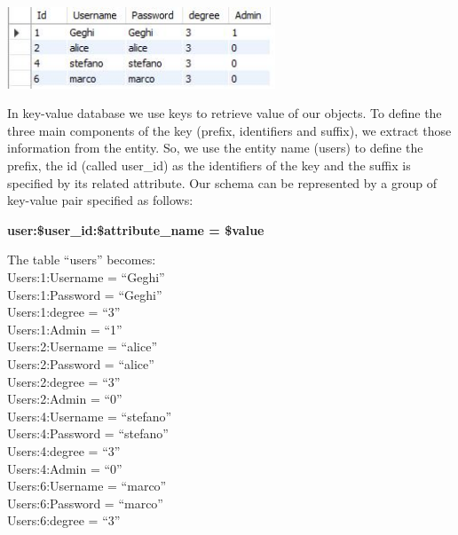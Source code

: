 \documentclass[a4paper, oneside]{article}
\begin{document}
\begin{minipage}{\linewidth}
\begin{center}
\vspace{4mm}
\includegraphics[width = 0.6\textwidth]{./images/table/users.jpg} 
\vspace{2mm}
\label{fig:tableUsers}
\end{center}
\vspace{3mm}
\end{minipage}
In key-value database we use keys to retrieve value of our objects. To define the three main components of the key (prefix, identifiers and suffix), we extract those information from the entity. So, we use the entity name (users) to define the prefix, the id (called user\_id) as the identifiers of the key and the suffix is specified by its related attribute. Our schema can be represented by a group of key-value pair specified as follows:\\
\begin{center}
	\textbf{user:\$user\_id:\$attribute\_name = \$value}
\end{center}
\vspace{5mm}
The table “users” becomes:
\vspace{2mm} \\
Users:1:Username = “Geghi”\\
Users:1:Password =  “Geghi”\\
Users:1:degree = “3”\\
Users:1:Admin = “1”\\
Users:2:Username = “alice”\\
Users:2:Password = “alice”\\
Users:2:degree = “3”\\
Users:2:Admin = “0”\\
Users:4:Username = “stefano”\\
Users:4:Password = “stefano”\\
Users:4:degree = “3”\\
Users:4:Admin = “0”\\
Users:6:Username = “marco”\\
Users:6:Password = “marco”\\
Users:6:degree = “3”\\
\end{document}
